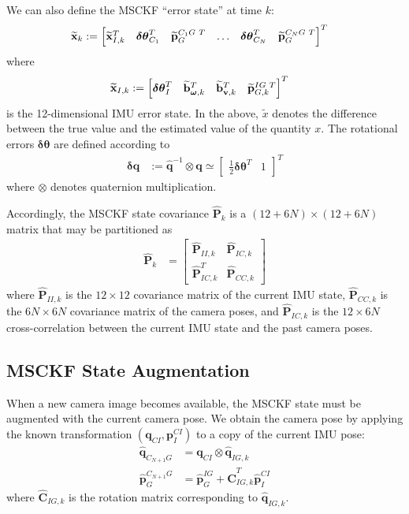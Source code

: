 \documentclass[letterpaper, 10 pt, conference]{ieeeconf}  %
\def\Vec#1{\mathbf{#1}}
\newcommand{\bbm}{\begin{bmatrix}}
\newcommand{\ebm}{\end{bmatrix}}
\begin{document}
We can also define the MSCKF ``error state'' at time $k$:
\begin{align*}
    \widetilde{\Vec{x}}_k &:= \bbm \widetilde{\Vec{x}}_{I,k}^T & \boldsymbol{\delta\theta}_{C_1}^T & \widetilde{\Vec{p}}_G^{C_1 G \hspace{0.3em} T} & \hdots & \boldsymbol{\delta\theta}_{C_N}^T & \widetilde{\Vec{p}}_G^{C_N G \hspace{0.3em} T} \ebm ^T
\end{align*}
where
\begin{align}
    \widetilde{\Vec{x}}_{I,k} &:= \bbm \boldsymbol{\delta\theta}_I^T & \widetilde{\Vec{b}}_{\boldsymbol{\omega},k}^T & \widetilde{\Vec{b}}_{\Vec{v},k}^T & \widetilde{\Vec{p}}_{G,k}^{IG \hspace{0.3em} T} \ebm^T
\end{align}
is the 12-dimensional IMU error state.
In the above, $\widetilde{x}$ denotes the difference between the true value and the estimated value of the quantity $x$.
The rotational errors $\boldsymbol{\delta\theta}$ are defined according to
\begin{align}
    \boldsymbol{\delta}\Vec{q} &:= \hat{\Vec{q}}^{-1} \otimes \Vec{q} \simeq \bbm \frac{1}{2}\boldsymbol{\delta\theta}^T & 1 \ebm^T
\end{align}
where $\otimes$ denotes quaternion multiplication.

Accordingly, the MSCKF state covariance $\hat{\Vec{P}}_k$ is a $(12+6N)\times(12+6N)$ matrix that may be partitioned as
\begin{align} \label{eq:covariance}
    \hat{\Vec{P}}_k &= \bbm \hat{\Vec{P}}_{II,k} & \hat{\Vec{P}}_{IC,k} \\ \hat{\Vec{P}}_{IC,k}^T & \hat{\Vec{P}}_{CC,k} \ebm
\end{align}
where $\hat{\Vec{P}}_{II,k}$ is the $12\times12$ covariance matrix of the current IMU state, $\hat{\Vec{P}}_{CC,k}$ is the $6N\times6N$ covariance matrix of the camera poses, and $\hat{\Vec{P}}_{IC,k}$ is the $12\times6N$ cross-correlation between the current IMU state and the past camera poses.

\subsection{MSCKF State Augmentation}
When a new camera image becomes available, the MSCKF state must be augmented with the current camera pose.
We obtain the camera pose by applying the known transformation $\left(\Vec{q}_{CI}, \Vec{p}_I^{CI}\right)$ to a copy of the current IMU pose:
\begin{align}
    \hat{\Vec{q}}_{C_{N+1} G} &= \Vec{q}_{CI} \otimes \hat{\Vec{q}}_{IG,k} \\
    \hat{\Vec{p}}_G^{C_{N+1}G} &= \hat{\Vec{p}}_G^{IG} + \hat{\Vec{C}}_{IG,k}^T \hat{\Vec{p}}_I^{CI}
\end{align}
where $\hat{\Vec{C}}_{IG,k}$ is the rotation matrix corresponding to $\hat{\Vec{q}}_{IG,k}$.
\end{document}
